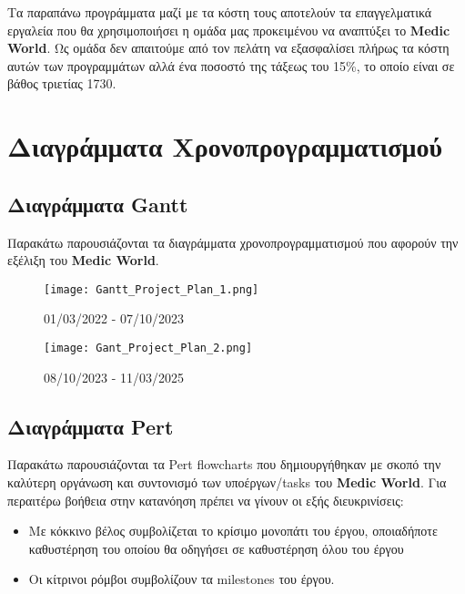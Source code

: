 \documentclass{article}
\begin{document}
\vspace{0.3cm}
     
Τα παραπάνω προγράμματα μαζί με τα κόστη τους αποτελούν τα επαγγελματικά εργαλεία που θα χρησιμοποιήσει η ομάδα μας προκειμένου να  αναπτύξει το \textbf{Medic World}. Ως ομάδα δεν απαιτούμε από τον πελάτη να εξασφαλίσει πλήρως τα κόστη αυτών των προγραμμάτων αλλά ένα ποσοστό της τάξεως του 15\%, το οποίο είναι σε βάθος τριετίας {1730\texteuro}.

\section{Διαγράμματα Χρονοπρογραμματισμού}

\subsection{Διαγράμματα Gantt}

Παρακάτω παρουσιάζονται τα διαγράμματα χρονοπρογραμματισμού που αφορούν την εξέλιξη του \textbf{Medic World}.

\vspace{0.3cm}

\begin{figure}[!htb]
\centering
\texttt{[image: Gantt\_Project\_Plan\_1.png]}
\caption{\label{fig:Pert4} 01/03/2022 - 07/10/2023}
\end{figure}

\vspace{0.3cm}

\begin{figure}[!htb]
\centering
\texttt{[image: Gant\_Project\_Plan\_2.png]}
\caption{\label{fig:Pert4} 08/10/2023 - 11/03/2025}
\end{figure}
\vspace{0.5cm}

\subsection{Διαγράμματα Pert}

Παρακάτω παρουσιάζονται τα Pert flowcharts που δημιουργήθηκαν με σκοπό την καλύτερη οργάνωση και συντονισμό των υποέργων/tasks του \textbf{Medic World}. Για περαιτέρω βοήθεια στην κατανόηση πρέπει να γίνουν οι εξής διευκρινίσεις:

\begin{itemize}
  \item Με κόκκινο βέλος συμβολίζεται το κρίσιμο μονοπάτι του έργου, οποιαδήποτε καθυστέρηση του οποίου θα οδηγήσει σε καθυστέρηση όλου του έργου
  \item Οι κίτρινοι ρόμβοι συμβολίζουν τα milestones του έργου.
\end{itemize}
\end{document}
